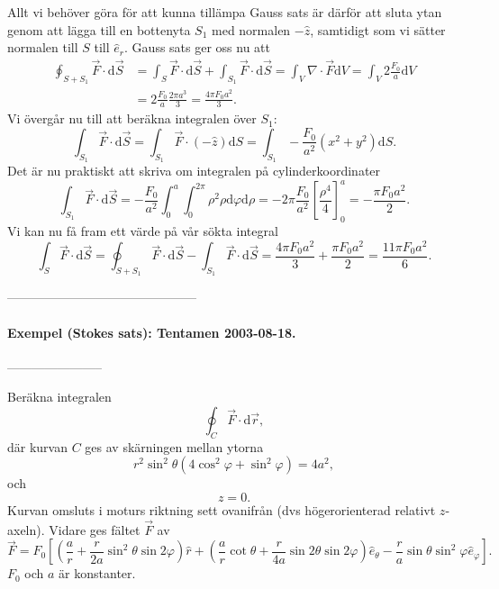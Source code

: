 \documentclass[%
oneside,                 %
final,                   %
10pt]{article}
\begin{document}
Allt vi behöver göra för att kunna tillämpa Gauss sats är därför att sluta ytan genom att lägga till en bottenyta $S_1$ med normalen $-\hat{z}$, samtidigt som vi sätter normalen till $S$ till $\hat{e}_r$.  Gauss sats ger oss nu att
\begin{align}
  \oint_{S+S_1} \vec{F}\cdot \mbox{d}\vec{S} &= \int_S \vec{F}\cdot \mbox{d}\vec{S} +
\int_{S_1} \vec{F}\cdot \mbox{d}\vec{S} = \int_V \nabla \cdot \vec{F} \mbox{d}V =
\int_V 2 \frac{F_0}{a} \mbox{d}V \nonumber \\
& = 2\frac{F_0}{a} \frac{2\pi a^3}{3} =
\frac{4\pi F_0 a^2}{3}.
\end{align}
Vi övergår nu till att beräkna integralen över $S_1$:
\begin{equation}
  \int_{S_1} \vec{F}\cdot \mbox{d}\vec{S} = \int_{S_1} \vec{F} \cdot \left(-
\hat{z} \right) \mbox{d}S = \int_{S_1} - \frac{F_0}{a^2} \left(x^2 + y^2
\right) \mbox{d}S.
\end{equation}
Det är nu praktiskt att skriva om integralen på cylinderkoordinater
\begin{equation}
  \int_{S_1} \vec{F}\cdot \mbox{d}\vec{S} = - \frac{F_0}{a^2} \int_0^a
\int_0^{2\pi} \rho^2 \rho \mbox{d}\varphi \mbox{d}\rho = -2\pi 
\frac{F_0}{a^2} \left[\frac{\rho^4}{4}\right]_0^a = - \frac{\pi F_0 a^2}{2}.
\end{equation}
Vi kan nu få fram ett värde på vår sökta integral
\begin{equation}
  \int_S \vec{F}\cdot \mbox{d}\vec{S} = \oint_{S+S_1} \vec{F}\cdot \mbox{d}\vec{S}
-\int_{S_1} \vec{F}\cdot \mbox{d}\vec{S} = \frac{4\pi F_0 a^2}{3} + 
\frac{\pi F_0 a^2}{2} = \frac{11\pi F_0 a^2}{6}.
\end{equation}

---------------------------------------------

\paragraph{Exempel (Stokes sats): Tentamen 2003-08-18.}
-----------------------

Beräkna integralen
\begin{equation}
  \oint_C \vec{F}\cdot \mbox{d}\vec{r},
\end{equation}
där kurvan $C$ ges av skärningen mellan ytorna
\begin{equation}
  r^2\sin^2 \theta \left(4 \cos^2 \varphi + \sin^2 \varphi\right) = 4 a^2,
\end{equation}
och
\begin{equation}
  z = 0.
\end{equation}
Kurvan omsluts i moturs riktning sett ovanifrån (dvs högerorienterad relativt $z$-axeln). 
Vidare ges fältet $\vec{F}$ av
\begin{equation}
  \vec{F} = F_0 \left[\left(\frac{a}{r} + \frac{r}{2a}\sin^2 \theta \sin 2\varphi
\right) \hat{r} + \left(\frac{a}{r} \cot \theta + \frac{r}{4a} 
\sin 2 \theta \sin 2 \varphi\right) \hat{e}_\theta -
\frac{r}{a} \sin \theta \sin^2 \varphi \hat{e}_\varphi \right].
\end{equation}
$F_0$ och $a$ är konstanter. \\
\end{document}

